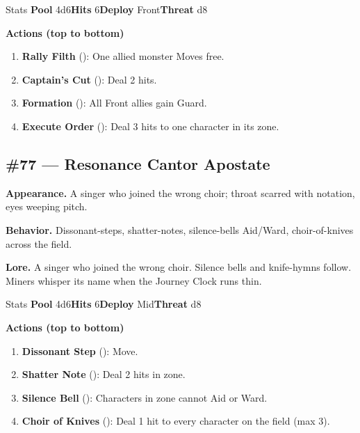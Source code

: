 \begin{monsterentry}{Stats}
\textbf{Pool} 4d6\quad\textbf{Hits} 6\quad\textbf{Deploy} Front\quad\textbf{Threat} d8

\textbf{Actions (top to bottom)}
\begin{enumerate}\setlength{\itemsep}{0.15em}\setlength{\parskip}{0pt}
  \item \textbf{Rally Filth} (\easy): One allied monster Moves free.
  \item \textbf{Captain's Cut} (\medium): Deal 2 hits.
  \item \textbf{Formation} (\medium): All Front allies gain Guard.
  \item \textbf{Execute Order} (\hard): Deal 3 hits to one character in its zone.
\end{enumerate}
\end{monsterentry}

\subsection*{\#77 --- Resonance Cantor Apostate}

\textbf{Appearance.} A singer who joined the wrong choir; throat scarred with notation, eyes weeping pitch.

\textbf{Behavior.} Dissonant-steps, shatter-notes, silence-bells Aid/Ward, choir-of-knives across the field.

\textbf{Lore.} A singer who joined the wrong choir. Silence bells and knife-hymns follow. Miners whisper its name when the Journey Clock runs thin.

\begin{monsterentry}{Stats}
\textbf{Pool} 4d6\quad\textbf{Hits} 6\quad\textbf{Deploy} Mid\quad\textbf{Threat} d8

\textbf{Actions (top to bottom)}
\begin{enumerate}\setlength{\itemsep}{0.15em}\setlength{\parskip}{0pt}
  \item \textbf{Dissonant Step} (\easy): Move.
  \item \textbf{Shatter Note} (\medium): Deal 2 hits in zone.
  \item \textbf{Silence Bell} (\hard): Characters in zone cannot Aid or Ward.
  \item \textbf{Choir of Knives} (\hard): Deal 1 hit to every character on the field (max 3).
\end{enumerate}
\end{monsterentry}

